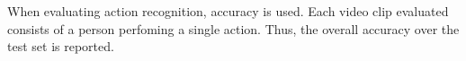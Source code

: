 \documentclass[twoside]{article}
\begin{document}
\begin{multicols}{2}
When evaluating action recognition, accuracy is used.
Each video clip evaluated consists of a person perfoming a single action.
Thus, the overall accuracy over the test set is reported.





\end{multicols}
\end{document}
